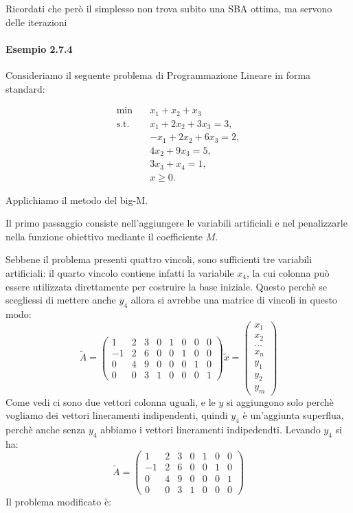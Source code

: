 Ricordati che però il simplesso non trova subito una SBA ottima, ma servono delle iterazioni
\paragraph{Esempio 2.7.4}

Consideriamo il seguente problema di
Programmazione Lineare in forma standard:

\[
\begin{aligned}
\min \quad & x_1+x_2+x_3\\
\text{s.t.}\quad
& x_1+2x_2+3x_3=3,\\
& -x_1+2x_2+6x_3=2,\\
& 4x_2+9x_3=5,\\
& 3x_3+x_4=1,\\
& x\geq 0.
\end{aligned}
\]

Applichiamo il metodo del big-M.

Il primo passaggio consiste nell'aggiungere
le variabili artificiali e nel penalizzarle
nella funzione obiettivo mediante il coefficiente $M$.

Sebbene il problema presenti quattro vincoli,
sono sufficienti tre variabili artificiali:
il quarto vincolo contiene infatti la variabile $x_4$,
la cui colonna può essere utilizzata direttamente
per costruire la base iniziale.
Questo perchè se scegliessi di mettere anche $y_4$ allora si avrebbe una matrice di vincoli in questo modo: \\
\[
\widetilde{A} = \begin{pmatrix}
    1&2&3&0&1&0&0&0\\
    -1&2&6&0&0&1&0&0\\
    0&4&9&0&0&0&1&0\\
    0&0&3&1&0&0&0&1 
\end{pmatrix} \widetilde{x} = \begin{pmatrix}
    x_1 \\ x_2 \\ \dots \\ x_n \\ y_1 \\ y_2 \\ y_m 
\end{pmatrix}
\]
Come vedi ci sono due vettori colonna uguali, e le $y$ si aggiungono solo perchè vogliamo dei vettori lineramenti indipendenti, quindi $y_4$ è un'aggiunta superflua, perchè anche senza $y_4$ abbiamo i vettori lineramenti indipedendti.
Levando $y_4$ si ha: \\ 
\[
\widetilde{A} = \begin{pmatrix}
    1&2&3&0&1&0&0\\
    -1&2&6&0&0&1&0\\
    0&4&9&0&0&0&1\\
    0&0&3&1&0&0&0 
\end{pmatrix}
\]
Il problema modificato è:

